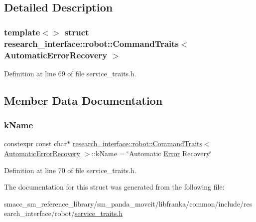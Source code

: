 \subsection{Detailed Description}
\subsubsection*{template$<$$>$\newline
struct research\+\_\+interface\+::robot\+::\+Command\+Traits$<$ Automatic\+Error\+Recovery $>$}



Definition at line 69 of file service\+\_\+traits.\+h.



\subsection{Member Data Documentation}
\mbox{\label{structresearch__interface_1_1robot_1_1CommandTraits_3_01AutomaticErrorRecovery_01_4_a0777fcccbd0b9673cd03d0951191de1e}} 
\subsubsection{\texorpdfstring{k\+Name}{kName}}
{\footnotesize\ttfamily constexpr const char$\ast$ \hyperlink{structresearch__interface_1_1robot_1_1CommandTraits}{research\+\_\+interface\+::robot\+::\+Command\+Traits}$<$ \hyperlink{structresearch__interface_1_1robot_1_1AutomaticErrorRecovery}{Automatic\+Error\+Recovery} $>$\+::k\+Name = \char`\"{}Automatic \hyperlink{namespaceresearch__interface_1_1robot_a32c6a50656f8b9130114ad84bdde7589}{Error} Recovery\char`\"{}\hspace{0.3cm}{\ttfamily [static]}}



Definition at line 70 of file service\+\_\+traits.\+h.



The documentation for this struct was generated from the following file\+:\begin{DoxyCompactItemize}
\item 
smacc\+\_\+sm\+\_\+reference\+\_\+library/sm\+\_\+panda\+\_\+moveit/libfranka/common/include/research\+\_\+interface/robot/\hyperlink{service__traits_8h}{service\+\_\+traits.\+h}\end{DoxyCompactItemize}
